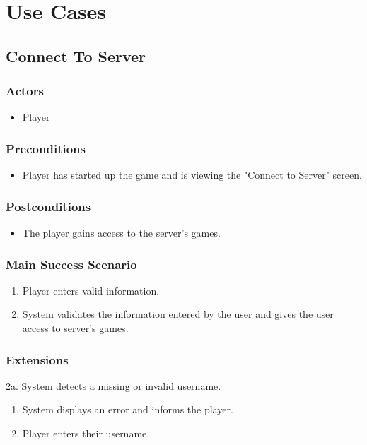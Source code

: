 \chapter{Use Cases}

\section{Connect To Server}
\subsection{Actors}
\begin{itemize}
	\item Player
\end{itemize}

\subsection{Preconditions}
\begin{itemize}
	\item Player has started up the game and is viewing the "Connect to Server" screen.
\end{itemize}

\subsection{Postconditions}
\begin{itemize}
	\item The player gains access to the server's games.
\end{itemize}

\subsection{Main Success Scenario}
\begin{enumerate}
	\item Player enters valid information.
	\item System validates the information entered by the user and gives the user access to server's games.
\end{enumerate}

\subsection{Extensions}
2a. System detects a missing or invalid username.
\begin{enumerate}
	\item System displays an error and informs the player.
	\item Player enters their username.
\end{enumerate}

